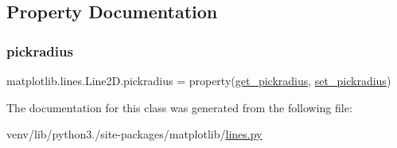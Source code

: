 \subsection{Property Documentation}
\mbox{\label{classmatplotlib_1_1lines_1_1Line2D_ad384465e5db045c5caccc38bf84a2a8d}} 
\subsubsection{\texorpdfstring{pickradius}{pickradius}}
{\footnotesize\ttfamily matplotlib.\+lines.\+Line2\+D.\+pickradius = property(\hyperlink{classmatplotlib_1_1lines_1_1Line2D_ad45a36309becae396671597a8d95f242}{get\+\_\+pickradius}, \hyperlink{classmatplotlib_1_1lines_1_1Line2D_a55175911cf70d74606fcefd4047c8321}{set\+\_\+pickradius})\hspace{0.3cm}{\ttfamily [static]}}



The documentation for this class was generated from the following file\+:\begin{DoxyCompactItemize}
\item 
venv/lib/python3./site-\/packages/matplotlib/\hyperlink{lines_8py}{lines.\+py}\end{DoxyCompactItemize}
